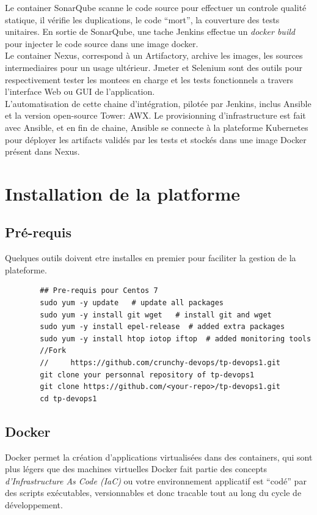 \documentclass{article}
\begin{document}
Le container SonarQube scanne le code source pour effectuer un controle qualité statique, il vérifie les duplications,
le code ``mort'', la couverture des tests unitaires.
En sortie de SonarQube, une tache Jenkins effectue un \textit{docker build} pour injecter le code source dans une image
docker. \\
Le container Nexus, correspond à un Artifactory, archive les images, les sources intermediaires pour un usage ultérieur.
Jmeter et Selenium sont des outils pour respectivement tester les montees en charge et les tests fonctionnels a travers
l'interface Web ou GUI de l'application. \\
L'automatisation de cette chaine d'intégration, pilotée par Jenkins, inclus Ansible et la version open-source Tower: AWX.
Le provisionning d'infrastructure est fait avec Ansible, et en fin de chaine, Ansible se connecte à la plateforme Kubernetes
pour déployer les artifacts validés par les tests et stockés dans une image Docker présent dans Nexus.


\section{Installation de la platforme}
\subsection{Pré-requis}
Quelques outils doivent etre installes en premier pour faciliter la gestion de la plateforme.
\begin{commandline}
	\begin{verbatim}
		## Pre-requis pour Centos 7
		sudo yum -y update   # update all packages
		sudo yum -y install git wget   # install git and wget
		sudo yum -y install epel-release  # added extra packages
		sudo yum -y install htop iotop iftop  # added monitoring tools
		//Fork
		//     https://github.com/crunchy-devops/tp-devops1.git
		git clone your personnal repository of tp-devops1
		git clone https://github.com/<your-repo>/tp-devops1.git
		cd tp-devops1
	\end{verbatim}
\end{commandline}

\subsection{Docker}
Docker permet la création d'applications virtualisées dans des containers, qui sont plus légers que des machines virtuelles
Docker fait partie des concepts \textit{d'Infrastructure As Code (IaC)} ou votre environnement applicatif est ``codé''
par des scripts exécutables, versionnables et donc tracable tout au long du cycle de développement.
\end{document}
